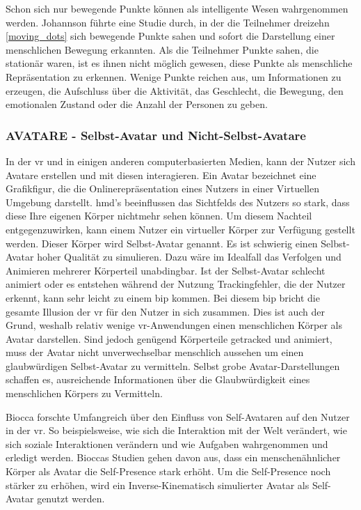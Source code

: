\documentclass[a4paper,11pt]{article}%
\renewcommand{\\}{\vspace*{0.5\baselineskip} \newline}
\begin{document}
Schon sich nur bewegende Punkte können als intelligente Wesen wahrgenommen werden. Johannson \citep[p.76-89]{johansson1975visual} führte eine Studie durch, in der die Teilnehmer dreizehn \autoref{moving_dots} sich bewegende Punkte sahen und sofort die Darstellung einer menschlichen Bewegung erkannten. Als die Teilnehmer Punkte sahen, die stationär waren, ist es ihnen nicht möglich gewesen, diese Punkte als menschliche Repräsentation zu erkennen. Wenige Punkte reichen aus, um Informationen zu erzeugen, die Aufschluss über die Aktivität, das Geschlecht, die Bewegung, den emotionalen Zustand oder die Anzahl der Personen zu geben.

		\subsubsection{AVATARE - Selbst-Avatar und Nicht-Selbst-Avatare}

In der \ac{vr} und in einigen anderen computerbasierten Medien, kann der Nutzer sich Avatare erstellen und mit diesen interagieren. Ein Avatar bezeichnet eine Grafikfigur, die die Onlinerepräsentation eines Nutzers in einer Virtuellen Umgebung darstellt. \citep[p.1]{neustaedter2009presenting} \\
\ac{hmd}'s beeinflussen das Sichtfelds des Nutzers so stark, dass diese Ihre eigenen Körper nichtmehr sehen können. Um diesem Nachteil entgegenzuwirken, kann einem Nutzer ein virtueller Körper zur Verfügung gestellt werden. Dieser Körper wird Selbst-Avatar genannt.
Es ist schwierig einen Selbst-Avatar hoher Qualität zu simulieren. Dazu wäre im Idealfall das Verfolgen und Animieren mehrerer Körperteil unabdingbar. Ist der Selbst-Avatar schlecht animiert oder es entstehen während der Nutzung Trackingfehler, die der Nutzer erkennt, kann sehr leicht zu einem \ac{bip} kommen. Bei diesem \ac{bip} bricht die gesamte Illusion der \ac{vr} für den Nutzer in sich zusammen. 
Dies ist auch der Grund, weshalb relativ wenige \ac{vr}-Anwendungen einen menschlichen Körper als Avatar darstellen.
Sind jedoch genügend Körperteile getracked und animiert, muss der Avatar nicht unverwechselbar menschlich aussehen um einen glaubwürdigen Selbst-Avatar zu vermitteln. Selbst grobe Avatar-Darstellungen schaffen es, ausreichende Informationen über die Glaubwürdigkeit eines menschlichen Körpers zu Vermitteln. \citep{lok2003effects}

Biocca forschte Umfangreich über den Einfluss von Self-Avataren auf den Nutzer in der \ac{vr}. \citep[421-427]{construal2014connected} 
\newline So beispielsweise, wie sich die Interaktion mit der Welt verändert, wie sich soziale Interaktionen verändern und wie Aufgaben wahrgenommen und erledigt werden. \citep{benford1995user} \citep{bowers1996talk}
Bioccas Studien gehen davon aus, dass ein menschenähnlicher Körper als Avatar die Self-Presence stark erhöht. Um die Self-Presence noch stärker zu erhöhen, wird ein Inverse-Kinematisch simulierter Avatar als Self-Avatar genutzt werden.
\end{document}
